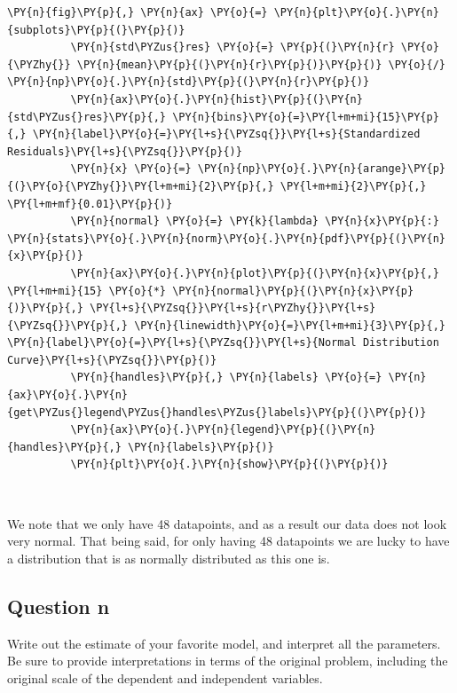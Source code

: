 \documentclass[10pt]{article}\usepackage[]{graphicx}\usepackage[]{xcolor}
\begin{document}
    \begin{Verbatim}[commandchars=\\\{\}]
 \PY{n}{fig}\PY{p}{,} \PY{n}{ax} \PY{o}{=} \PY{n}{plt}\PY{o}{.}\PY{n}{subplots}\PY{p}{(}\PY{p}{)}
          \PY{n}{std\PYZus{}res} \PY{o}{=} \PY{p}{(}\PY{n}{r} \PY{o}{\PYZhy{}} \PY{n}{mean}\PY{p}{(}\PY{n}{r}\PY{p}{)}\PY{p}{)} \PY{o}{/} \PY{n}{np}\PY{o}{.}\PY{n}{std}\PY{p}{(}\PY{n}{r}\PY{p}{)}
          \PY{n}{ax}\PY{o}{.}\PY{n}{hist}\PY{p}{(}\PY{n}{std\PYZus{}res}\PY{p}{,} \PY{n}{bins}\PY{o}{=}\PY{l+m+mi}{15}\PY{p}{,} \PY{n}{label}\PY{o}{=}\PY{l+s}{\PYZsq{}}\PY{l+s}{Standardized Residuals}\PY{l+s}{\PYZsq{}}\PY{p}{)}
          \PY{n}{x} \PY{o}{=} \PY{n}{np}\PY{o}{.}\PY{n}{arange}\PY{p}{(}\PY{o}{\PYZhy{}}\PY{l+m+mi}{2}\PY{p}{,} \PY{l+m+mi}{2}\PY{p}{,} \PY{l+m+mf}{0.01}\PY{p}{)}
          \PY{n}{normal} \PY{o}{=} \PY{k}{lambda} \PY{n}{x}\PY{p}{:} \PY{n}{stats}\PY{o}{.}\PY{n}{norm}\PY{o}{.}\PY{n}{pdf}\PY{p}{(}\PY{n}{x}\PY{p}{)}
          \PY{n}{ax}\PY{o}{.}\PY{n}{plot}\PY{p}{(}\PY{n}{x}\PY{p}{,} \PY{l+m+mi}{15} \PY{o}{*} \PY{n}{normal}\PY{p}{(}\PY{n}{x}\PY{p}{)}\PY{p}{,} \PY{l+s}{\PYZsq{}}\PY{l+s}{r\PYZhy{}}\PY{l+s}{\PYZsq{}}\PY{p}{,} \PY{n}{linewidth}\PY{o}{=}\PY{l+m+mi}{3}\PY{p}{,} \PY{n}{label}\PY{o}{=}\PY{l+s}{\PYZsq{}}\PY{l+s}{Normal Distribution Curve}\PY{l+s}{\PYZsq{}}\PY{p}{)}
          \PY{n}{handles}\PY{p}{,} \PY{n}{labels} \PY{o}{=} \PY{n}{ax}\PY{o}{.}\PY{n}{get\PYZus{}legend\PYZus{}handles\PYZus{}labels}\PY{p}{(}\PY{p}{)}
          \PY{n}{ax}\PY{o}{.}\PY{n}{legend}\PY{p}{(}\PY{n}{handles}\PY{p}{,} \PY{n}{labels}\PY{p}{)}
          \PY{n}{plt}\PY{o}{.}\PY{n}{show}\PY{p}{(}\PY{p}{)}
\end{Verbatim}

    \begin{center}
    \end{center}
    { \hspace*{\fill} \\}
    
    We note that we only have 48 datapoints, and as a result our data does
not look very normal. That being said, for only having 48 datapoints we
are lucky to have a distribution that is as normally distributed as this
one is.



\subsection*{Question n}
    Write out the estimate of your favorite model, and interpret all the parameters. Be sure to provide
    interpretations in terms of the original problem, including the original scale of the dependent and independent
    variables.\newline
\end{document}
